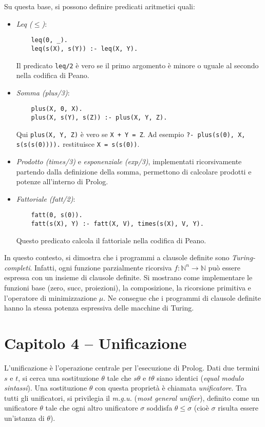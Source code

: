 \documentclass[12pt]{article}
\begin{document}
Su questa base, si possono definire predicati aritmetici quali:
\begin{itemize}
  \item \emph{Leq ($\leq$)}:
    \begin{verbatim}
    leq(0, _).
    leq(s(X), s(Y)) :- leq(X, Y).
    \end{verbatim}
    Il predicato \texttt{leq/2} è vero se il primo argomento è minore o uguale al secondo nella codifica di Peano.
  \item \emph{Somma (plus/3)}:
    \begin{verbatim}
    plus(X, 0, X).
    plus(X, s(Y), s(Z)) :- plus(X, Y, Z).
    \end{verbatim}
    Qui \texttt{plus(X, Y, Z)} è vero se \texttt{X + Y = Z}. Ad esempio \texttt{?- plus(s(0), X, s(s(s(0)))).} restituisce \texttt{X = s(s(0))}.
  \item \emph{Prodotto (times/3)} e \emph{esponenziale (exp/3)}, implementati ricorsivamente partendo dalla definizione della somma, permettono di calcolare prodotti e potenze all'interno di Prolog.
  \item \emph{Fattoriale (fatt/2)}:
    \begin{verbatim}
    fatt(0, s(0)).
    fatt(s(X), Y) :- fatt(X, V), times(s(X), V, Y).
    \end{verbatim}
    Questo predicato calcola il fattoriale nella codifica di Peano.
\end{itemize}

In questo contesto, si dimostra che i programmi a clausole definite sono \emph{Turing-completi}. Infatti, ogni funzione parzialmente ricorsiva $f:\mathbb{N}^n\to\mathbb{N}$ può essere espressa con un insieme di clausole definite. Si mostrano come implementare le funzioni base (zero, succ, proiezioni), la composizione, la ricorsione primitiva e l'operatore di minimizzazione $\mu$. Ne consegue che i programmi di clausole definite hanno la stessa potenza espressiva delle macchine di Turing.

\section*{Capitolo 4 – Unificazione}

L'unificazione è l'operazione centrale per l'esecuzione di Prolog. Dati due termini $s$ e $t$, si cerca una sostituzione $\theta$ tale che $s\theta$ e $t\theta$ siano identici (\emph{equal modulo sintassi}). Una sostituzione $\theta$ con questa proprietà è chiamata \emph{unificatore}. Tra tutti gli unificatori, si privilegia il \emph{m.g.u.} (\emph{most general unifier}), definito come un unificatore $\theta$ tale che ogni altro unificatore $\sigma$ soddisfa $\theta \leq \sigma$ (cioè $\sigma$ risulta essere un’istanza di $\theta$). 
\end{document}
